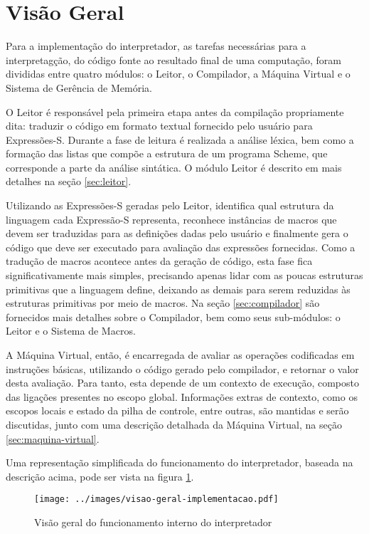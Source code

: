 \section{Visão Geral}
\label{sec:estrategia_geral}

Para a implementação do interpretador, as tarefas necessárias para a
interpretagção, do código fonte ao resultado final de uma computação, foram
divididas entre quatro módulos: o Leitor, o Compilador, a Máquina Virtual e o
Sistema de Gerência de Memória.


O Leitor é responsável pela primeira etapa antes da compilação propriamente
dita: traduzir o código em formato textual fornecido pelo usuário para
Expressões-S. Durante a fase de leitura é realizada a análise léxica, bem como
a formação das listas que compõe a estrutura de um programa Scheme, que
corresponde a parte da análise sintática. O módulo Leitor é descrito em mais
detalhes na seção \ref{sec:leitor}.

Utilizando as Expressões-S geradas pelo Leitor, identifica qual estrutura da
linguagem cada Expressão-S representa, reconhece instâncias de macros que devem
ser traduzidas para as definições dadas pelo usuário e finalmente gera o código
que deve ser executado para avaliação das expressões fornecidas. Como a
tradução de macros acontece antes da geração de código, esta fase fica
significativamente mais simples, precisando apenas lidar com as poucas
estruturas primitivas que a linguagem define, deixando as demais para serem
reduzidas às estruturas primitivas por meio de macros. Na seção
\ref{sec:compilador} são fornecidos mais detalhes sobre o Compilador, bem como
seus sub-módulos: o Leitor e o Sistema de Macros.

A Máquina Virtual, então, é encarregada de avaliar as operações codificadas em
instruções básicas, utilizando o código gerado pelo compilador, e retornar o
valor desta avaliação. Para tanto, esta depende de um contexto de execução,
composto das ligações presentes no escopo global. Informações extras de
contexto, como os escopos locais e estado da pilha de controle, entre outras,
são mantidas e serão discutidas, junto com uma descrição detalhada da Máquina
Virtual, na seção \ref{sec:maquina-virtual}.

Uma representação simplificada do funcionamento do interpretador, baseada na descrição acima, pode
ser vista na figura \ref{fig:visao-geral-implementacao}.

\begin{figure}[h!]
\centering
\texttt{[image: ../images/visao-geral-implementacao.pdf]}
\caption{Visão geral do funcionamento interno do interpretador}
\label{fig:visao-geral-implementacao}
\end{figure}

